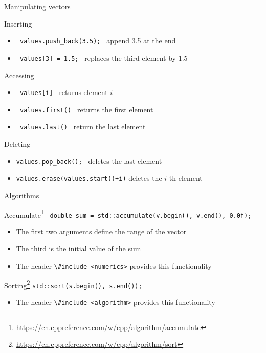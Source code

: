 \documentclass[\classoption]{beamer}
\begin{document}
\begin{frame}{Manipulating vectors}

\begin{block}{Inserting}
\begin{itemize}
\item \lstinline| values.push_back(3.5); | append 3.5 at the end
\item \lstinline| values[3] = 1.5; | replaces the third element by 1.5
\end{itemize}
\end{block}

\begin{block}{Accessing}
\begin{itemize}
\item \lstinline| values[i] | returns element $i$
\item \lstinline| values.first() | returns the first element
\item \lstinline| values.last() | return the last element
\end{itemize}
\end{block}

\begin{block}{Deleting}
\begin{itemize}
\item \lstinline|values.pop_back(); | deletes the last element
\item \lstinline|values.erase(values.start()+i)| deletes the $i$-th element 
\end{itemize}
\end{block}

\end{frame}


\begin{frame}{Algorithms}

\begin{block}{Accumulate\footnote{\tiny\url{https://en.cppreference.com/w/cpp/algorithm/accumulate}}}
\lstinline| double sum = std::accumulate(v.begin(), v.end(), 0.0f); |
\begin{itemize}
\item The first two arguments define the range of the vector
\item The third is the initial value of the sum 
\item The header \lstinline|\#include <numerics>| provides this functionality
\end{itemize}
\end{block}

\begin{block}{Sorting\footnote{\tiny\url{https://en.cppreference.com/w/cpp/algorithm/sort}}}
\lstinline|std::sort(s.begin(), s.end());|
\begin{itemize}
\item The header \lstinline|\#include <algorithm>| provides this functionality
\end{itemize}
\end{block}

\end{frame}
\end{document}
